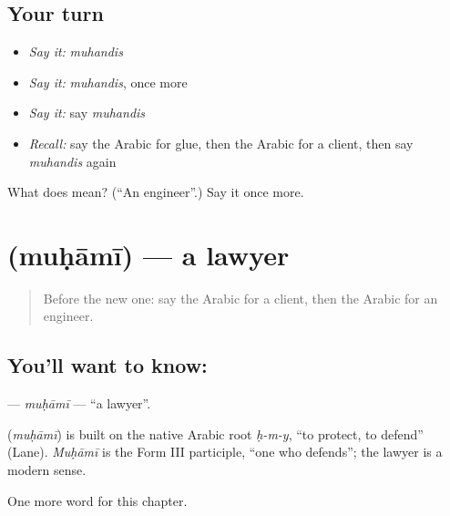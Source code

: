 \subsection*{Your turn}
\begin{itemize}
\raggedright
  \item \emph{Say it:} \emph{muhandis}
  \item \emph{Say it:} \emph{muhandis}, once more
  \item \emph{Say it:} say \emph{muhandis}
  \item \emph{Recall:} say the Arabic for glue, then the Arabic for a client, then say \emph{muhandis} again
\end{itemize}

\begin{tcolorbox}[breakable,colback=teal!4,colframe=teal!35!black,title={Before you move on}]
What does  mean? (\textquotedblleft{}An engineer\textquotedblright{}.) Say it once more.
\end{tcolorbox}
\section[\texorpdfstring{\ar{محامي} (muḥāmī)}{محامي (muḥāmī)}]{ (muḥāmī) — a lawyer}

\label{lesson:AR-C280-muhami}



\begin{quote}
Before the new one: say the Arabic for a client, then the Arabic for an engineer.
\end{quote}

\subsection*{You'll want to know: }
\textbf{} — \emph{muḥāmī} — \textquotedblleft{}a lawyer\textquotedblright{}.

\begin{cousinweb}
\textbf{} (\emph{muḥāmī}) is built on the native Arabic root \emph{ḥ-m-y}, \textquotedblleft{}to protect, to defend\textquotedblright{} (Lane). \emph{Muḥāmī} is the Form III participle, \textquotedblleft{}one who defends\textquotedblright{}; the lawyer is a modern sense.
\end{cousinweb}

\begin{grammarlens}[title={What you've built}]
One more word for this chapter.
\end{grammarlens}

